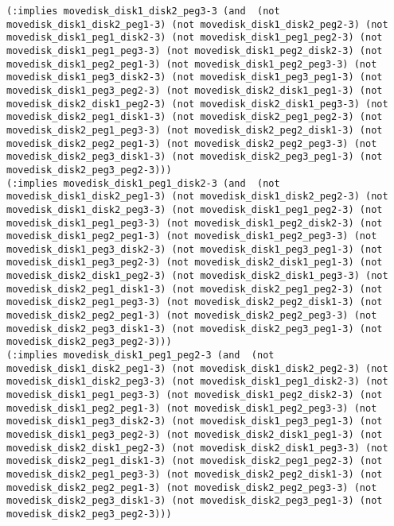 \documentclass[12pt,letterpaper]{ntdhw}
\begin{document}
\begin{enumerate}
\begin{enumerate}
\begin{lstlisting}[language=pddl, style=pddlstyle,
  basicstyle=\scriptsize]
(:implies movedisk_disk1_disk2_peg3-3 (and  (not movedisk_disk1_disk2_peg1-3) (not movedisk_disk1_disk2_peg2-3) (not movedisk_disk1_peg1_disk2-3) (not movedisk_disk1_peg1_peg2-3) (not movedisk_disk1_peg1_peg3-3) (not movedisk_disk1_peg2_disk2-3) (not movedisk_disk1_peg2_peg1-3) (not movedisk_disk1_peg2_peg3-3) (not movedisk_disk1_peg3_disk2-3) (not movedisk_disk1_peg3_peg1-3) (not movedisk_disk1_peg3_peg2-3) (not movedisk_disk2_disk1_peg1-3) (not movedisk_disk2_disk1_peg2-3) (not movedisk_disk2_disk1_peg3-3) (not movedisk_disk2_peg1_disk1-3) (not movedisk_disk2_peg1_peg2-3) (not movedisk_disk2_peg1_peg3-3) (not movedisk_disk2_peg2_disk1-3) (not movedisk_disk2_peg2_peg1-3) (not movedisk_disk2_peg2_peg3-3) (not movedisk_disk2_peg3_disk1-3) (not movedisk_disk2_peg3_peg1-3) (not movedisk_disk2_peg3_peg2-3)))
(:implies movedisk_disk1_peg1_disk2-3 (and  (not movedisk_disk1_disk2_peg1-3) (not movedisk_disk1_disk2_peg2-3) (not movedisk_disk1_disk2_peg3-3) (not movedisk_disk1_peg1_peg2-3) (not movedisk_disk1_peg1_peg3-3) (not movedisk_disk1_peg2_disk2-3) (not movedisk_disk1_peg2_peg1-3) (not movedisk_disk1_peg2_peg3-3) (not movedisk_disk1_peg3_disk2-3) (not movedisk_disk1_peg3_peg1-3) (not movedisk_disk1_peg3_peg2-3) (not movedisk_disk2_disk1_peg1-3) (not movedisk_disk2_disk1_peg2-3) (not movedisk_disk2_disk1_peg3-3) (not movedisk_disk2_peg1_disk1-3) (not movedisk_disk2_peg1_peg2-3) (not movedisk_disk2_peg1_peg3-3) (not movedisk_disk2_peg2_disk1-3) (not movedisk_disk2_peg2_peg1-3) (not movedisk_disk2_peg2_peg3-3) (not movedisk_disk2_peg3_disk1-3) (not movedisk_disk2_peg3_peg1-3) (not movedisk_disk2_peg3_peg2-3)))
(:implies movedisk_disk1_peg1_peg2-3 (and  (not movedisk_disk1_disk2_peg1-3) (not movedisk_disk1_disk2_peg2-3) (not movedisk_disk1_disk2_peg3-3) (not movedisk_disk1_peg1_disk2-3) (not movedisk_disk1_peg1_peg3-3) (not movedisk_disk1_peg2_disk2-3) (not movedisk_disk1_peg2_peg1-3) (not movedisk_disk1_peg2_peg3-3) (not movedisk_disk1_peg3_disk2-3) (not movedisk_disk1_peg3_peg1-3) (not movedisk_disk1_peg3_peg2-3) (not movedisk_disk2_disk1_peg1-3) (not movedisk_disk2_disk1_peg2-3) (not movedisk_disk2_disk1_peg3-3) (not movedisk_disk2_peg1_disk1-3) (not movedisk_disk2_peg1_peg2-3) (not movedisk_disk2_peg1_peg3-3) (not movedisk_disk2_peg2_disk1-3) (not movedisk_disk2_peg2_peg1-3) (not movedisk_disk2_peg2_peg3-3) (not movedisk_disk2_peg3_disk1-3) (not movedisk_disk2_peg3_peg1-3) (not movedisk_disk2_peg3_peg2-3)))

\end{lstlisting}
\end{enumerate}
\end{enumerate}
\end{document}
